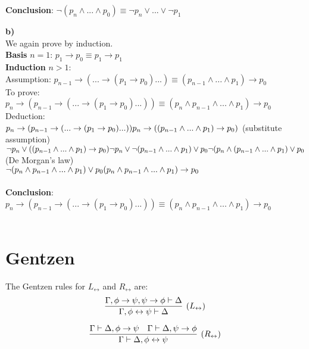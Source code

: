 \documentclass[]{article}
\begin{document}
\noindent \textbf{Conclusion}: $\neg (p_n \wedge ... \wedge p_0) \equiv \neg p_n \vee ... \vee \neg p_1$

\noindent \textbf{b)}\\
We again prove by induction. \\
\textbf{Basis} $n = 1$: $ p_1 \rightarrow p_0 \equiv p_1 \rightarrow p_1$\\
\textbf{Induction} $n > 1$:\\
Assumption: $p_{n-1} \rightarrow (...\rightarrow(p_1 \rightarrow p_0)...) \equiv (p_{n-1} \wedge ... \wedge p_1)\rightarrow p_0$\\
To prove: $p_n\rightarrow (p_{n-1} \rightarrow (...\rightarrow(p_1 \rightarrow p_0)...)) \equiv (p_n \wedge p_{n-1} \wedge ... \wedge p_1)\rightarrow p_0$\\ 
Deduction:\\
$p_n\rightarrow (p_{n-1} \rightarrow (...\rightarrow(p_1 \rightarrow p_0)...)) \\
p_n \rightarrow ((p_{n-1} \wedge ... \wedge p_1) \rightarrow p_0)$ (substitute assumption) \\ $
\neg p_n \vee ((p_{n-1} \wedge ... \wedge p_1) \rightarrow p_0) \\
\neg p_n \vee \neg (p_{n-1} \wedge ... \wedge p_1) \vee p_0 \\
\neg (p_n \wedge (p_{n-1} \wedge ... \wedge p_1) \vee p_0$ (De Morgan's law) \\ $
\neg (p_n \wedge p_{n-1} \wedge ... \wedge p_1) \vee p_0 \\
(p_n \wedge p_{n-1} \wedge ... \wedge p_1) \rightarrow p_0$ \\ \\

\noindent \textbf{Conclusion}: $p_n\rightarrow (p_{n-1} \rightarrow (...\rightarrow(p_1 \rightarrow p_0)...)) \equiv (p_n \wedge p_{n-1} \wedge ... \wedge p_1)\rightarrow p_0$\\ \\

\section{Gentzen}
\label{Gentzen}
The Gentzen rules for $L_\leftrightarrow$ and $R_\leftrightarrow$ are:
$$
\infer[(L_\leftrightarrow)]{\Gamma, \phi \leftrightarrow \psi\vdash\Delta}{\Gamma, \phi \rightarrow \psi, \psi \rightarrow \phi\vdash\Delta}
$$

$$
\infer[(R_\leftrightarrow)]{\Gamma\vdash\Delta, \phi \leftrightarrow \psi}{
\Gamma \vdash \Delta, \phi \rightarrow \psi
&
\Gamma \vdash \Delta, \psi \rightarrow \phi
}
$$
\end{document}
